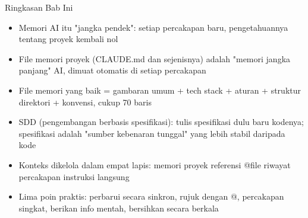 \begin{tcbsummary}{Ringkasan Bab Ini}
\begin{itemize}
  \item Memori AI itu "jangka pendek": setiap percakapan baru, pengetahuannya tentang proyek kembali nol
  \item File memori proyek (CLAUDE.md dan sejenisnya) adalah "memori jangka panjang" AI, dimuat otomatis di setiap percakapan
  \item File memori yang baik = gambaran umum + tech stack + aturan + struktur direktori + konvensi, cukup 70 baris
  \item SDD (pengembangan berbasis spesifikasi): tulis spesifikasi dulu baru kodenya; spesifikasi adalah "sumber kebenaran tunggal" yang lebih stabil daripada kode
  \item Konteks dikelola dalam empat lapis: memori proyek referensi @file riwayat percakapan instruksi langsung
  \item Lima poin praktis: perbarui secara sinkron, rujuk dengan @, percakapan singkat, berikan info mentah, bersihkan secara berkala
\end{itemize}

\end{tcbsummary}

